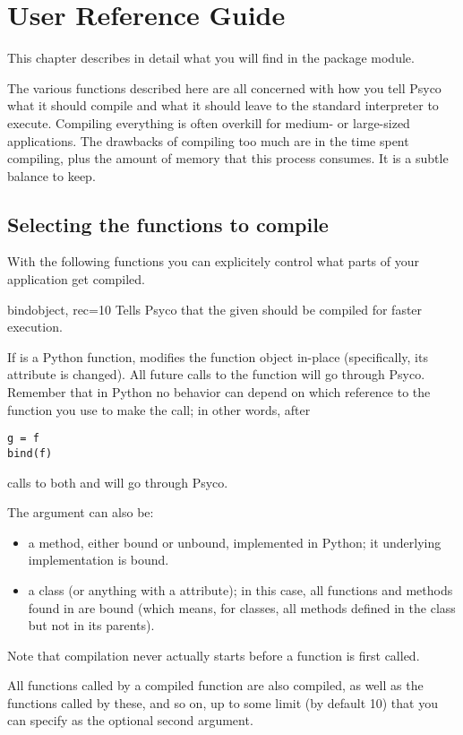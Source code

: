 \documentclass{manual}
\begin{document}
\chapter{User Reference Guide}


This chapter describes in detail what you will find in the  package module.

The various functions described here are all concerned with how you tell Psyco what it should compile and what it should leave to the standard interpreter to execute.  Compiling everything is often overkill for medium- or large-sized applications.  The drawbacks of compiling too much are in the time spent compiling, plus the amount of memory that this process consumes.  It is a subtle balance to keep.


\section{Selecting the functions to compile}

With the following functions you can explicitely control what parts of your application get compiled.

\begin{funcdesc}{bind}{object, rec=10}
  Tells Psyco that the given  should be compiled for faster execution.

  If  is a Python function,   modifies the function object in-place (specifically, its  attribute is changed).  All future calls to the function will go through Psyco.  Remember that in Python no behavior can depend on which reference to the function you use to make the call; in other words, after

\begin{verbatim}
g = f
bind(f)
\end{verbatim}

  calls to both  and  will go through Psyco.

  The  argument can also be:
  \begin{itemize}
    \item a method, either bound or unbound, implemented in Python; it underlying implementation is bound.
    \item a class (or anything with a  attribute); in this case, all functions and methods found in  are bound (which means, for classes, all methods defined in the class but not in its parents).
  \end{itemize}

  Note that compilation never actually starts before a function is first called.

  All functions called by a compiled function are also compiled, as well as the functions called by these, and so on, up to some limit (by default 10) that you can specify as the optional second argument.
\end{funcdesc}
\end{document}
